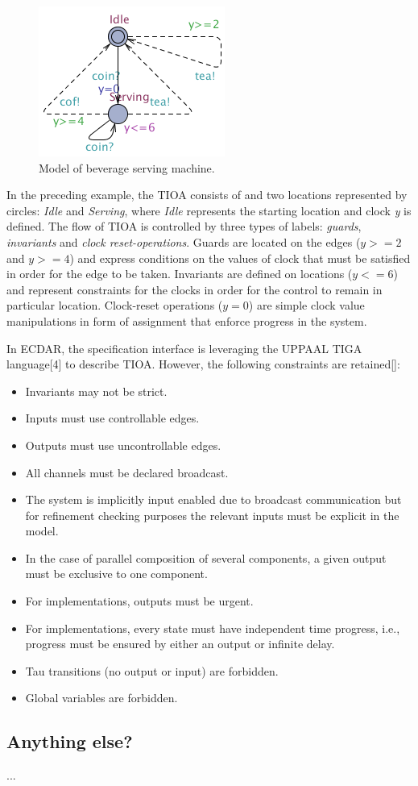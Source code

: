 \begin{figure}
\begin{centering}
\includegraphics[scale=0.7]{images/bev_machine_model}
\par\end{centering}

\caption{Model of beverage serving machine.}
\end{figure}

In the preceding example, the TIOA consists of and two locations represented by 
circles: \emph{Idle} and \emph{Serving}, where \emph{Idle} represents the starting location and clock \emph{y} 
is defined. The flow of TIOA is controlled by three types of labels: \emph{guards}, \emph{invariants} and \emph{clock reset-operations}. 
Guards are located on the edges ($y>=2$ and $y>=4$) and express conditions on the values of clock that must be satisfied in order for 
the edge to be taken. Invariants are defined on locations ($y<=6$) and represent constraints for the clocks in order for the control to 
remain in particular location. Clock-reset operations ($y=0$) are simple clock value manipulations in form of assignment that enforce progress in the system.


In ECDAR, the specification interface is leveraging the UPPAAL TIGA language[4] to describe TIOA. However, the following constraints are retained[]:   
%
\begin{itemize}
\item Invariants may not be strict.
\item Inputs must use controllable edges.
\item Outputs must use uncontrollable edges.
\item All channels must be declared broadcast.
\item The system is implicitly input enabled due to broadcast communication but for refinement checking purposes the relevant inputs must be explicit in the model.
\item In the case of parallel composition of several components, a given output must be exclusive to one component.
\item For implementations, outputs must be urgent.
\item For implementations, every state must have independent time progress, i.e., progress must be ensured by either an output or infinite delay.
\item Tau transitions (no output or input) are forbidden.
\item Global variables are forbidden.
\end{itemize}

\subsection{Anything else?}
%
...
%
